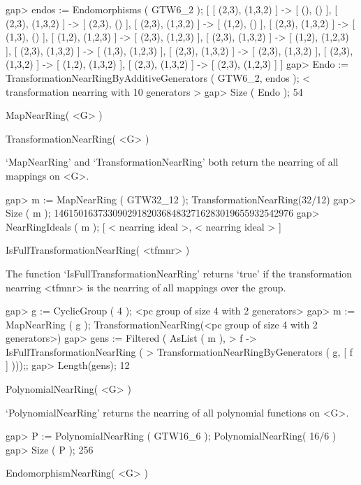 \beginexample
    gap> endos := Endomorphisms ( GTW6_2 );
    [ [ (2,3), (1,3,2) ] -> [ (), () ], 
      [ (2,3), (1,3,2) ] -> [ (2,3), () ], 
      [ (2,3), (1,3,2) ] -> [ (1,2), () ], 
      [ (2,3), (1,3,2) ] -> [ (1,3), () ], 
      [ (1,2), (1,2,3) ] -> [ (2,3), (1,2,3) ], 
      [ (2,3), (1,3,2) ] -> [ (1,2), (1,2,3) ], 
      [ (2,3), (1,3,2) ] -> [ (1,3), (1,2,3) ], 
      [ (2,3), (1,3,2) ] -> [ (2,3), (1,3,2) ], 
      [ (2,3), (1,3,2) ] -> [ (1,2), (1,3,2) ], 
      [ (2,3), (1,3,2) ] -> [ (2,3), (1,2,3) ] ]
    gap> Endo := TransformationNearRingByAdditiveGenerators ( GTW6_2, endos );
    < transformation nearring with 10 generators >
    gap> Size ( Endo );
    54
\endexample



\>MapNearRing( <G> )

\>TransformationNearRing( <G> )

`MapNearRing' and `TransformationNearRing' both return the nearring of all
mappings on <G>.

\beginexample
    gap> m := MapNearRing ( GTW32_12 );
    TransformationNearRing(32/12)
    gap> Size ( m );
    1461501637330902918203684832716283019655932542976
    gap> NearRingIdeals ( m );
    [ < nearring ideal >, < nearring ideal > ]
\endexample

\>IsFullTransformationNearRing( <tfmnr> )

The function `IsFullTransformationNearRing' returns `true' if the
transformation nearring <tfmnr> is the nearring of all mappings over
the group.

\beginexample
    gap> g := CyclicGroup ( 4 );
    <pc group of size 4 with 2 generators>
    gap> m := MapNearRing ( g );
    TransformationNearRing(<pc group of size 4 with 2 generators>)
    gap> gens := Filtered ( AsList ( m ), 
    >       f -> IsFullTransformationNearRing ( 
    >               TransformationNearRingByGenerators ( g, [ f ] )));;
    gap> Length(gens);
    12
\endexample

\>PolynomialNearRing( <G> )

`PolynomialNearRing' returns the nearring of all polynomial functions on <G>.

\beginexample
    gap> P := PolynomialNearRing ( GTW16_6 );
    PolynomialNearRing( 16/6 )
    gap> Size ( P );
    256
\endexample
    
\>EndomorphismNearRing( <G> )

